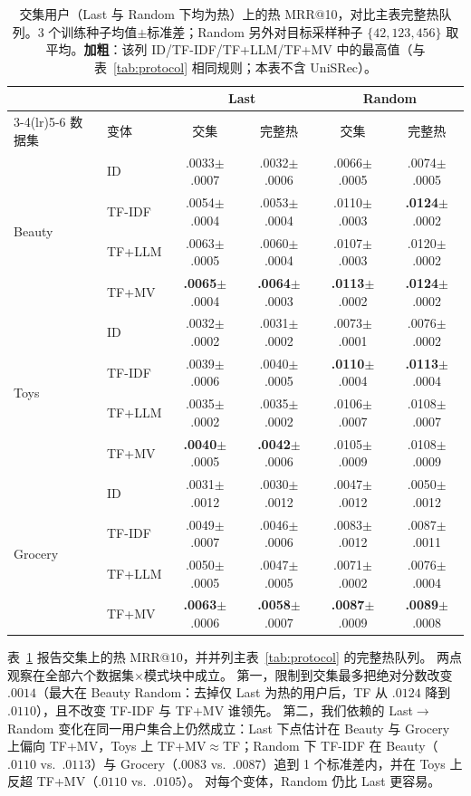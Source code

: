 \documentclass[sigconf,natbib=true,anonymous]{acmart}
\newcommand{\tfidf}{\textsc{TF-IDF}\xspace}
\newcommand{\tfllm}{\textsc{TF+LLM}\xspace}
\newcommand{\tfmv}{\textsc{TF+MV}\xspace}
\begin{document}
\begin{table}[H]
\centering
\caption{交集用户（Last 与 Random 下均为热）上的热 MRR@10，对比主表完整热队列。3 个训练种子均值$\pm$标准差；Random 另外对目标采样种子 $\{42,123,456\}$ 取平均。\textbf{加粗}：该列 ID/\tfidf/\tfllm/\tfmv 中的最高值（与表~\ref{tab:protocol} 相同规则；本表不含 UniSRec）。}
\label{tab:intersection}
\small
\setlength{\tabcolsep}{3pt}
\begin{tabular}{@{}llcccc@{}}
\toprule
& & \multicolumn{2}{c}{Last} & \multicolumn{2}{c}{Random} \\
\cmidrule(lr){3-4}\cmidrule(lr){5-6}
数据集 & 变体 & 交集 & 完整热 & 交集 & 完整热 \\
\midrule
\multirow{4}{*}{Beauty}
 & ID     & .0033$\pm$.0007 & .0032$\pm$.0006 & .0066$\pm$.0005 & .0074$\pm$.0005 \\
 & \tfidf & .0054$\pm$.0004 & .0053$\pm$.0004 & .0110$\pm$.0003 & \textbf{.0124}$\pm$.0002 \\
 & \tfllm & .0063$\pm$.0005 & .0060$\pm$.0004 & .0107$\pm$.0003 & .0120$\pm$.0002 \\
 & \tfmv  & \textbf{.0065}$\pm$.0004 & \textbf{.0064}$\pm$.0003 & \textbf{.0113}$\pm$.0002 & \textbf{.0124}$\pm$.0002 \\
\midrule
\multirow{4}{*}{Toys}
 & ID     & .0032$\pm$.0002 & .0031$\pm$.0002 & .0073$\pm$.0001 & .0076$\pm$.0002 \\
 & \tfidf & .0039$\pm$.0006 & .0040$\pm$.0005 & \textbf{.0110}$\pm$.0004 & \textbf{.0113}$\pm$.0004 \\
 & \tfllm & .0035$\pm$.0002 & .0035$\pm$.0002 & .0106$\pm$.0007 & .0108$\pm$.0007 \\
 & \tfmv  & \textbf{.0040}$\pm$.0005 & \textbf{.0042}$\pm$.0006 & .0105$\pm$.0009 & .0108$\pm$.0009 \\
\midrule
\multirow{4}{*}{Grocery}
 & ID     & .0031$\pm$.0012 & .0030$\pm$.0012 & .0047$\pm$.0012 & .0050$\pm$.0012 \\
 & \tfidf & .0049$\pm$.0007 & .0046$\pm$.0006 & .0083$\pm$.0012 & .0087$\pm$.0011 \\
 & \tfllm & .0050$\pm$.0005 & .0047$\pm$.0005 & .0071$\pm$.0002 & .0076$\pm$.0004 \\
 & \tfmv  & \textbf{.0063}$\pm$.0006 & \textbf{.0058}$\pm$.0007 & \textbf{.0087}$\pm$.0009 & \textbf{.0089}$\pm$.0008 \\
\bottomrule
\end{tabular}
\end{table}

表~\ref{tab:intersection} 报告交集上的热 MRR@10，并并列主表~\ref{tab:protocol} 的完整热队列。
两点观察在全部六个数据集$\times$模式块中成立。
第一，限制到交集最多把绝对分数改变 $.0014$（最大在 Beauty Random：去掉仅 Last 为热的用户后，TF 从 $.0124$ 降到 $.0110$），且不改变 \tfidf 与 \tfmv 谁领先。
第二，我们依赖的 Last$\to$Random 变化在同一用户集合上仍然成立：Last 下点估计在 Beauty 与 Grocery 上偏向 \tfmv，Toys 上 TF+MV${}\approx{}$TF；Random 下 \tfidf 在 Beauty（$.0110$ vs.\ $.0113$）与 Grocery（$.0083$ vs.\ $.0087$）追到 1 个标准差内，并在 Toys 上反超 \tfmv（$.0110$ vs.\ $.0105$）。
对每个变体，Random 仍比 Last 更容易。
\end{document}
